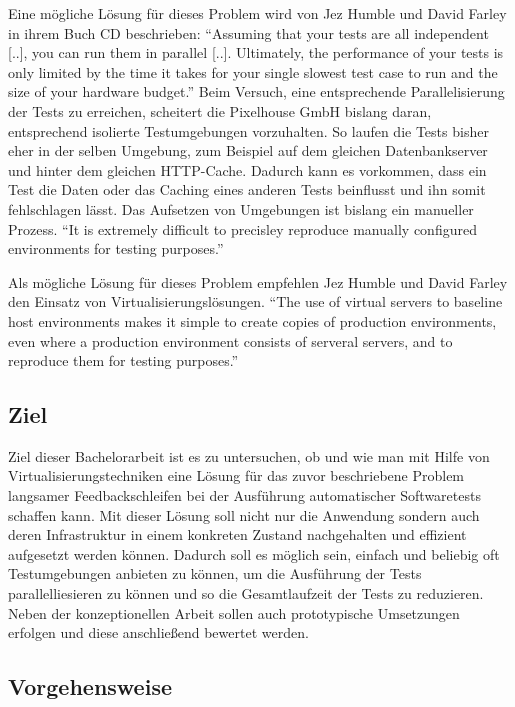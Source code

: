 Eine mögliche Lösung für dieses Problem wird von Jez Humble und David Farley in ihrem Buch \ac{CD} beschrieben: "`Assuming that your tests are all independent [..], you can run them in parallel [..]. Ultimately, the performance of your tests is only limited by the time it takes for your single slowest test case to run and the size of your hardware budget."' \citep[S.][S. 310]{HumFar10} Beim Versuch, eine entsprechende Parallelisierung der Tests zu erreichen, scheitert die Pixelhouse GmbH bislang daran, entsprechend isolierte Testumgebungen vorzuhalten. So laufen die Tests bisher eher in der selben Umgebung, zum Beispiel auf dem gleichen Datenbankserver und hinter dem gleichen HTTP-Cache. Dadurch kann es vorkommen, dass ein Test die Daten oder das Caching eines anderen Tests beinflusst und ihn somit fehlschlagen lässt. Das Aufsetzen von Umgebungen ist bislang ein manueller Prozess. "`It is extremely difficult to precisley reproduce manually configured environments for testing purposes."' \citep[S.][S. 49]{HumFar10}

Als mögliche Lösung für dieses Problem empfehlen Jez Humble und David Farley den Einsatz von Virtualisierungslösungen. "`The use of virtual servers to baseline host environments makes it simple to create copies of production environments, even where a production environment consists of serveral servers, and to reproduce them for testing purposes."' \citep[S.][S. 304]{HumFar10}

\subsection{Ziel}

Ziel dieser Bachelorarbeit ist es zu untersuchen, ob und wie man mit Hilfe von Virtualisierungstechniken eine Lösung für das zuvor beschriebene Problem langsamer Feedbackschleifen bei der Ausführung automatischer Softwaretests schaffen kann. Mit dieser Lösung soll nicht nur die Anwendung sondern auch deren Infrastruktur in einem konkreten Zustand nachgehalten und effizient aufgesetzt werden können. Dadurch soll es möglich sein, einfach und beliebig oft Testumgebungen anbieten zu können, um die Ausführung der Tests parallelliesieren zu können und so die Gesamtlaufzeit der Tests zu reduzieren. Neben der konzeptionellen Arbeit sollen auch prototypische Umsetzungen erfolgen und diese anschließend bewertet werden.

\subsection{Vorgehensweise}

